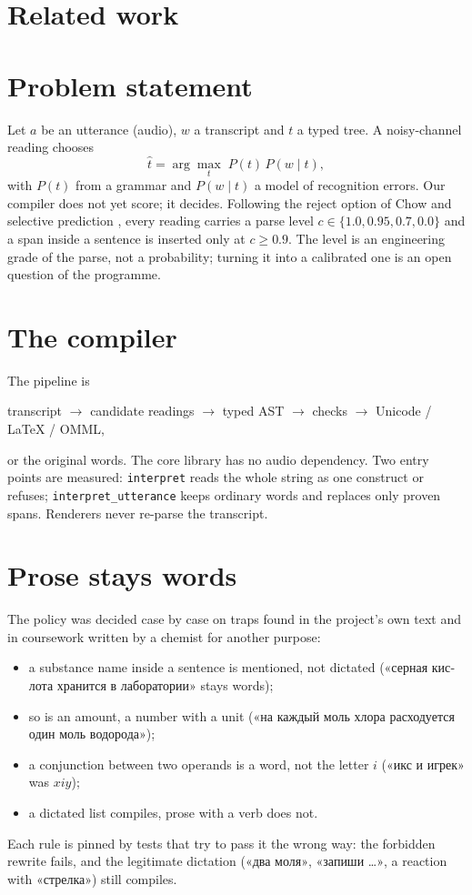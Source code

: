 \documentclass[11pt,a4paper]{article}
\newcommand{\ru}[1]{\foreignlanguage{russian}{#1}}
\begin{document}
\section{Related work}

\section{Problem statement}
Let $a$ be an utterance (audio), $w$ a transcript and $t$ a typed tree. A
noisy-channel reading chooses
\[
  \hat t = \arg\max_{t} \; P(t)\,P(w \mid t),
\]
with $P(t)$ from a grammar and $P(w \mid t)$ a model of recognition errors.
Our compiler does not yet score; it decides. Following the reject option of
Chow \cite{chow1970optimum} and selective prediction
\cite{elyaniv2010foundations,geifman2017selective}, every reading carries a
parse level $c \in \{1.0, 0.95, 0.7, 0.0\}$ and a span inside a sentence is
inserted only at $c \ge 0.9$. The level is an engineering grade of the parse,
not a probability; turning it into a calibrated one is an open question of
the programme.

\section{The compiler}
The pipeline is
\begin{center}
transcript $\to$ candidate readings $\to$ typed AST $\to$ checks $\to$
Unicode / \LaTeX{} / OMML,
\end{center}
or the original words. The core library has no audio dependency. Two entry
points are measured: \texttt{interpret} reads the whole string as one
construct or refuses; \texttt{interpret\_utterance} keeps ordinary words and
replaces only proven spans. Renderers never re-parse the transcript.

\section{Prose stays words}\label{sec:policy}
The policy was decided case by case on traps found in the project's own text
and in coursework written by a chemist for another purpose:
\begin{itemize}
  \item a substance name inside a sentence is mentioned, not dictated
        (\ru{«серная кислота хранится в лаборатории»} stays words);
  \item so is an amount, a number with a unit
        (\ru{«на каждый моль хлора расходуется один моль водорода»});
  \item a conjunction between two operands is a word, not the letter $i$
        (\ru{«икс и игрек»} was $xiy$);
  \item a dictated list compiles, prose with a verb does not.
\end{itemize}
Each rule is pinned by tests that try to pass it the wrong way: the
forbidden rewrite fails, and the legitimate dictation (\ru{«два моля»},
\ru{«запиши …»}, a reaction with \ru{«стрелка»}) still compiles.
\end{document}
